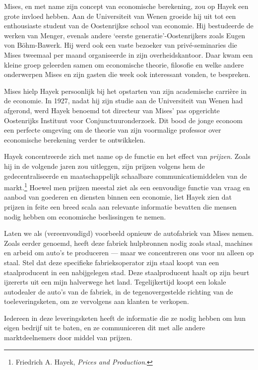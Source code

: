 \documentclass[
  a5paper,
  smalldemyvopaper,11pt,twoside,onecolumn,openright,extrafontsizes,
hidelinks]{memoir}
\begin{document}
Mises, en met name zijn concept van economische berekening, zou op Hayek
een grote invloed hebben. Aan de Universiteit van Wenen groeide hij uit
tot een enthousiaste student van de Oostenrijkse school van economie.
Hij bestudeerde de werken van Menger, evenals andere `eerste
generatie'-Oostenrijkers zoals Eugen von Böhm-Bawerk. Hij werd ook een
vaste bezoeker van privé-seminaries die Mises tweemaal per maand
organiseerde in zijn overheidskantoor. Daar kwam een kleine groep
geleerden samen om economische theorie, filosofie en welke andere
onderwerpen Mises en zijn gasten die week ook interessant vonden, te
bespreken.

Mises hielp Hayek persoonlijk bij het opstarten van zijn academische
carrière in de economie. In 1927, nadat hij zijn studie aan de
Universiteit van Wenen had afgerond, werd Hayek benoemd tot directeur
van Mises' pas opgerichte Oostenrijks Instituut voor
Conjunctuuronderzoek. Dit bood de jonge econoom een perfecte omgeving om
de theorie van zijn voormalige professor over economische berekening
verder te ontwikkelen.

Hayek concentreerde zich met name op de functie en het effect van
\emph{prijzen}. Zoals hij in de volgende jaren zou uitleggen, zijn
prijzen volgens hem de gedecentraliseerde en maatschappelijk schaalbare
communicatiemiddelen van de markt.\footnote{Friedrich A. Hayek,
  \emph{Prices and Production}.} Hoewel men prijzen meestal ziet als een
eenvoudige functie van vraag en aanbod van goederen en diensten binnen
een economie, liet Hayek zien dat prijzen in feite een breed scala aan
relevante informatie bevatten die mensen nodig hebben om economische
beslissingen te nemen.

Laten we als (vereenvoudigd) voorbeeld opnieuw de autofabriek van Mises
nemen. Zoals eerder genoemd, heeft deze fabriek hulpbronnen nodig zoals
staal, machines en arbeid om auto's te produceren --- maar we
concentreren ons voor nu alleen op staal. Stel dat deze specifieke
fabrieksoperator zijn staal koopt van een staalproducent in een
nabijgelegen stad. Deze staalproducent haalt op zijn beurt ijzererts uit
een mijn halverwege het land. Tegelijkertijd koopt een lokale autodealer
de auto's van de fabriek, in de tegenovergestelde richting van de
toeleveringsketen, om ze vervolgens aan klanten te verkopen.

Iedereen in deze leveringsketen heeft de informatie die ze nodig hebben
om hun eigen bedrijf uit te baten, en ze communiceren dit met alle
andere marktdeelnemers door middel van prijzen.
\end{document}
